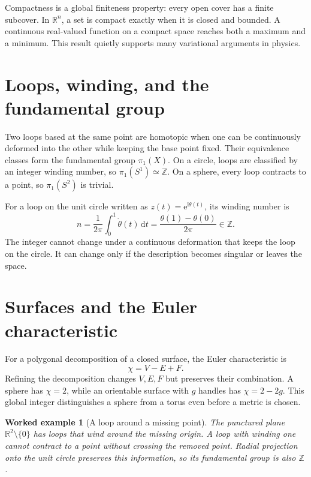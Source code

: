 \documentclass[11pt,oneside]{book}
\newcommand{\dd}{\mathrm{d}}
\newcommand{\ii}{\mathrm{i}}
\newcommand{\ee}{\mathrm{e}}
\theoremstyle{reviewstyle}
\newtheorem{example}{Worked example}[chapter]
\begin{document}
Compactness is a global finiteness property: every open cover has a finite subcover. In $\mathbb R^n$, a set is compact exactly when it is closed and bounded. A continuous real-valued function on a compact space reaches both a maximum and a minimum. This result quietly supports many variational arguments in physics.

\section{Loops, winding, and the fundamental group}
Two loops based at the same point are homotopic when one can be continuously deformed into the other while keeping the base point fixed. Their equivalence classes form the fundamental group $\pi_1(X)$. On a circle, loops are classified by an integer winding number, so $\pi_1(S^1)\simeq\mathbb Z$. On a sphere, every loop contracts to a point, so $\pi_1(S^2)$ is trivial.

For a loop on the unit circle written as $z(t)=\ee^{\ii\theta(t)}$, its winding number is
\begin{equation}
n=\frac1{2\pi}\int_0^1\dot\theta(t)\,\dd t
=\frac{\theta(1)-\theta(0)}{2\pi}\in\mathbb Z.
\end{equation}
The integer cannot change under a continuous deformation that keeps the loop on the circle. It can change only if the description becomes singular or leaves the space.

\section{Surfaces and the Euler characteristic}
For a polygonal decomposition of a closed surface, the Euler characteristic is
\begin{equation}\chi=V-E+F.
\end{equation}
Refining the decomposition changes $V,E,F$ but preserves their combination. A sphere has $\chi=2$, while an orientable surface with $g$ handles has $\chi=2-2g$. This global integer distinguishes a sphere from a torus even before a metric is chosen.

\begin{example}[A loop around a missing point]
The punctured plane $\mathbb R^2\setminus\{0\}$ has loops that wind around the missing origin. A loop with winding one cannot contract to a point without crossing the removed point. Radial projection onto the unit circle preserves this information, so its fundamental group is also $\mathbb Z$.
\end{example}
\end{document}
